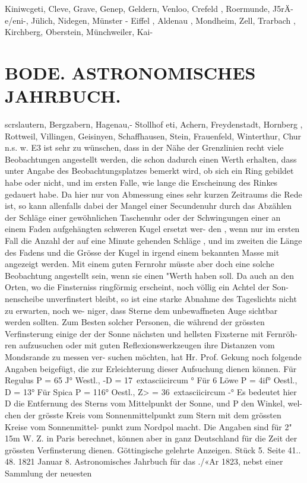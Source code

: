 \documentclass[12pt,a4paper]{article}
\begin{document}
{{{{{{{{Kiniwcgeti,  Cleve,  Grave,  Genep,  Geldern,  Venloo,  Crefeld ,  Roermunde,  J5rÄ-e/eni-,  Jülich, Nidegen,  Münster  -  Eiffel ,  Aldenau ,  Mondheim,  Zell,  Trarbach ,  Kirchberg,  Oberstein,  Münchweiler,  Kai-


\section*{BODE.     ASTRONOMISCHES  JAHRBUCH.}

scrslautern,  Bergzabern,  Hagenau,-  Stollhof eti,  Achern,  Freydenstadt,  Hornberg ,  Rottweil,  Villingen, Geisinyen,  Schaffhausen,  Stein,  Frauenfeld,  Winterthur,  Chur  n.s.  w. E3  ist  sehr  zu  wünschen,  dass  in  der  Nähe  der  Grenzlinien  recht  viele  Beobachtungen  angestellt werden,  die  schon  dadurch  einen  Werth  erhalten,  dass  unter  Angabe  des  Beobachtungsplatzes  bemerkt wird,  ob  sich  ein  Ring  gebildet  habe  oder  nicht,  und  im  ersten  Falle,  wie  lange  die  Erscheinung  des Rinkes  gedauert  habe.  Da  hier  nur  von  Abmessung  eines  sehr  kurzen  Zeitraums  die  Rede  ist,  so  kann allenfalls  dabei  der  Mangel  einer  Secundenuhr  durch  das  Abzählen  der  Schläge  einer  gewöhnlichen Taschenuhr  oder  der  Schwingungen  einer  an  einem  Faden  aufgehängten  schweren  Kugel  ersetzt  wer- den ,  wenn  nur  im  ersten  Fall  die  Anzahl  der  auf  eine  Minute  gehenden  Schläge ,  und  im  zweiten  die Länge  des  Fadens  und  die  Grösse  der  Kugel  in  irgend  einem  bekannten  Masse  mit  angezeigt  werden. Mit  einem  guten  Fernrohr  müsste  aber  doch  eine  solche  Beobachtung  angestellt  sein,  wenn  sie  einen "Werth  haben  soll. Da  auch  an  den  Orten,  wo  die  Finsterniss  ringförmig  erscheint,  noch  völlig  ein  Achtel  der  Son- nenscheibe unverfinstert  bleibt,  so  ist  eine  starke  Abnahme  des  Tageslichts  nicht  zu  erwarten,  noch  we- niger, dass  Sterne  dem  unbewaffneten  Auge  sichtbar  werden  sollten.  Zum  Besten  solcher  Personen,  die während  der  grössten  Verfinsterung  einige  der  der  Sonne  nächsten  und  hellsten  Fixsterne  mit  Fernröh- ren aufzusuchen  oder  mit  guten  Reflexionswerkzeugen  ihre  Distanzen  vom  Mondsrande  zu  messen  ver- suchen möchten,  hat  Hr.  Prof.  Gekung  noch  folgende  Angaben  beigefügt,  die  zur  Erleichterung  dieser Aufsuchung  dienen  können. Für  Regulus      P  =    65 J°  Westl.,      -D  =  17\	extasciicircum{}{ }° Für  6  Löwe       P  =    4if°  Oestl.,        D  =  13° Für  Spica  P  =  116°     Oestl.,        Z>  =  36\	extasciicircum{}{ }-° Es  bedeutet  hier  D  die  Entfernung  des  Sterns  vom  Mittelpunkt  der  Sonne,  und  P  den  Winkel,  wel- chen der  grösste  Kreis  vom  Sonnenmittelpunkt  zum  Stern  mit  dem  grössten  Kreise  vom  Sonnenmittel- punkt zum  Nordpol  macht.  Die  Angaben  sind  für  2"  15m  W.  Z.  in  Paris  berechnet,  können  aber  in  ganz Deutschland  für  die  Zeit  der  grössten  Verfinsterung  dienen. Göttingische  gelehrte  Anzeigen.     Stück  5.     Seite  41.. 48.     1821  Januar  8. Astronomisches  Jahrbuch  für  das  ./«Ar  1823,  nebst  einer  Sammlung  der  neuesten  }}}}}}}}
\end{document}
